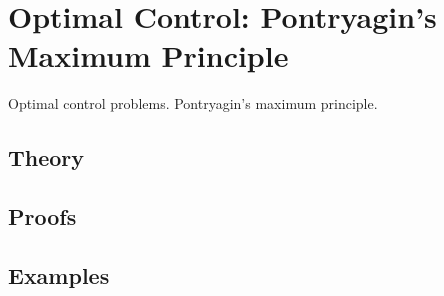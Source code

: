 
\section{Optimal Control: Pontryagin's Maximum Principle}
\label{sec:2.4.10-optimal-control-pontryagin}

\begin{ticket}
Optimal control problems. Pontryagin's maximum principle.
\end{ticket}

\subsection*{Theory}

\subsection*{Proofs}

\subsection*{Examples}
